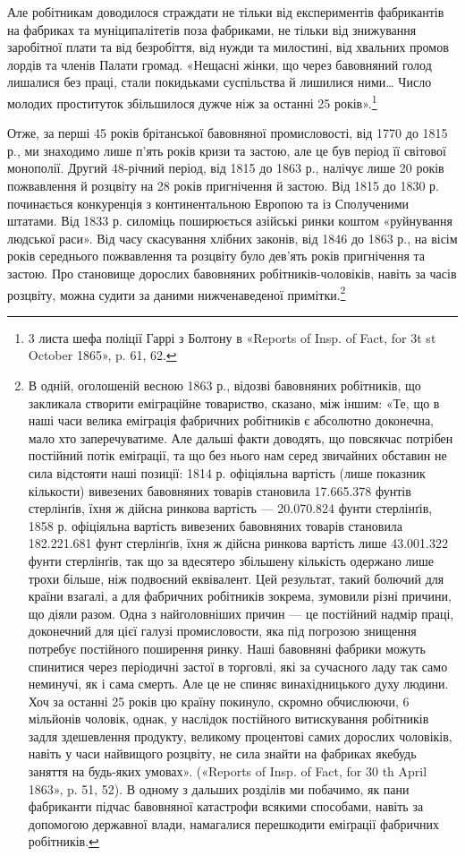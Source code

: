 \parcont{}  %
Але робітникам доводилося страждати не тільки від експериментів
фабрикантів на фабриках та муніципалітетів поза фабриками,
не тільки від знижування заробітної плати та від безробіття, від
нужди та милостині, від хвальних промов лордів та членів Палати
громад. «Нещасні жінки, що через бавовняний голод лишалися
без праці, стали покидьками суспільства й лишилися ними\dots{}
Число молодих проституток збільшилося дужче ніж за останні
25 років».\footnote{
3 листа шефа поліції Гаррі з Болтону в «Reports of Insp. of Fact,
for 3t st October 1865», p. 61, 62.
}

Отже, за перші 45 років брітанської бавовняної промисловості,
від 1770 до 1815 р., ми знаходимо лише п’ять років кризи та застою,
але це був період її світової монополії. Другий 48-річний період,
від 1815 до 1863 р., налічує лише 20 років пожвавлення
й розцвіту на 28 років пригнічення й застою. Від 1815 до 1830 р.
починається конкуренція з континентальною Европою та із
Сполученими штатами. Від 1833 р. силоміць поширюється азійські
ринки коштом «руйнування людської раси». Від часу скасування
хлібних законів, від 1846 до 1863 р., на вісім років середнього
пожвавлення та розцвіту було дев’ять років пригнічення
та застою. Про становище дорослих бавовняних робітників-чоловіків,
навіть за часів розцвіту, можна судити за даними нижченаведеної
примітки.\footnote{
В одній, оголошеній весною 1863 р., відозві бавовняних робітників,
що закликала створити еміграційне товариство, сказано, між іншим:
«Те, що в наші часи велика еміграція фабричних робітників є абсолютно
доконечна, мало хто заперечуватиме. Але дальші факти доводять, що
повсякчас потрібен постійний потік еміґрації, та що без нього нам серед
звичайних обставин не сила відстояти наші позиції: 1814 р. офіціяльна
вартість (лише показник кількости) вивезених бавовняних товарів становила
17.665.378 фунтів стерлінґів, їхня ж дійсна ринкова вартість —
20.070.824 фунти стерлінґів, 1858 р. офіціяльна вартість вивезених бавовняних
товарів становила 182.221.681 фунт стерлінґів, їхня ж дійсна
ринкова вартість лише 43.001.322 фунти стерлінґів, так що за вдесятеро
збільшену кількість одержано лише трохи більше, ніж подвоєний еквівалент.
Цей результат, такий болючий для країни взагалі, а для фабричних
робітників зокрема, зумовили різні причини, що діяли разом. Одна
з найголовніших причин — це постійний надмір праці, доконечний для
цієї галузі промисловости, яка під погрозою знищення потребує постійного
поширення ринку. Наші бавовняні фабрики можуть спинитися через
періодичні застої в торговлі, які за сучасного ладу так само неминучі,
як і сама смерть. Але це не спиняє винахідницького духу людини. Хоч
за останні 25 років цю країну покинуло, скромно обчислюючи, 6 мільйонів
чоловік, однак, у наслідок постійного витискування робітників задля
здешевлення продукту, великому процентові самих дорослих чоловіків,
навіть у часи найвищого розцвіту, не сила знайти на фабриках якебудь
заняття на будь-яких умовах». («Reports of Insp. of Fact, for 30 th April
1863», p. 51, 52). В одному з дальших розділів ми побачимо, як пани
фабриканти підчас бавовняної катастрофи всякими способами, навіть за
допомогою державної влади, намагалися перешкодити еміґрації фабричних
робітників.
}
\parbreak{}  %
